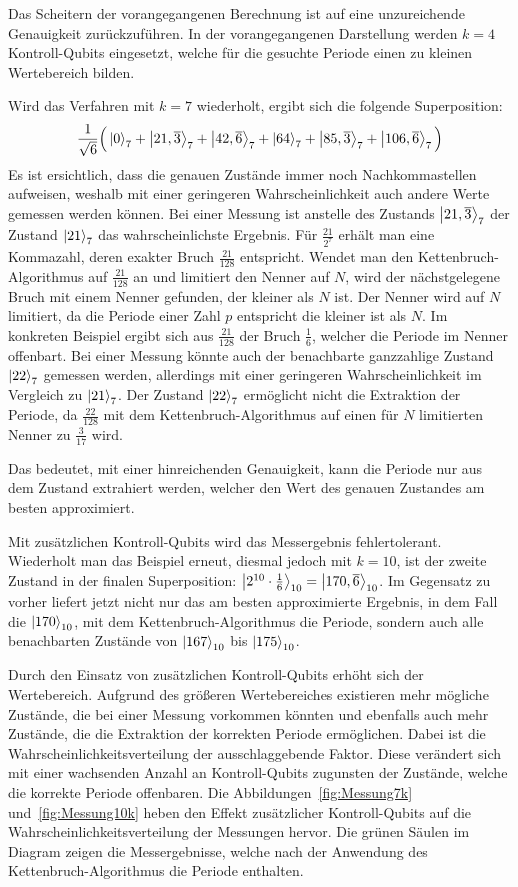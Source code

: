 Das Scheitern der vorangegangenen Berechnung ist auf eine unzureichende Genauigkeit zurückzuführen. 
In der vorangegangenen Darstellung werden \(k=4\) Kontroll-Qubits eingesetzt, 
welche für die gesuchte Periode einen zu kleinen Wertebereich bilden.

Wird das Verfahren mit \(k=7\) wiederholt, ergibt sich die folgende Superposition:
\[\frac{1}{\sqrt{6}}
\Big(\ket{0}_7 +\ket{21,\overline{3}}_7 + \ket{42,\overline{6}}_7+
\ket{64}_7+\ket{85,\overline{3}}_7 + \ket{106,\overline{6}}_7
\Big) \]
Es ist ersichtlich, dass die genauen Zustände immer noch Nachkommastellen aufweisen, 
weshalb mit einer geringeren Wahrscheinlichkeit auch andere Werte gemessen werden können.
Bei einer Messung ist anstelle des Zustands \(\ket{21,\overline{3}}_7\) der Zustand \(\ket{21}_7\) das wahrscheinlichste Ergebnis.
Für \(\frac{21}{2^{7}}\) erhält man eine Kommazahl, deren exakter Bruch \(\frac{21}{128}\) entspricht.
Wendet man den Kettenbruch-Algorithmus auf \(\frac{21}{128}\) an und limitiert den Nenner auf \(N\), 
wird der nächstgelegene Bruch mit einem Nenner gefunden, der kleiner als \(N\) ist.
Der Nenner wird auf \(N\) limitiert, da die Periode einer Zahl \(p\) entspricht die kleiner ist als \(N\).
Im konkreten Beispiel ergibt sich aus \(\frac{21}{128}\) der Bruch \(\frac{1}{6}\), 
welcher die Periode im Nenner offenbart.
Bei einer Messung könnte auch der benachbarte ganzzahlige Zustand \(\ket{22}_7\) gemessen werden, 
allerdings mit einer geringeren Wahrscheinlichkeit im Vergleich zu \(\ket{21}_7\).
Der Zustand \(\ket{22}_7\) ermöglicht nicht die Extraktion der Periode, 
da \(\frac{22}{128}\) mit dem Kettenbruch-Algorithmus auf einen für \(N\) limitierten Nenner
zu \(\frac{3}{17}\) wird.

Das bedeutet, 
mit einer hinreichenden Genauigkeit, kann die Periode nur aus dem Zustand extrahiert werden, 
welcher den Wert des genauen Zustandes am besten approximiert.

Mit zusätzlichen Kontroll-Qubits wird das Messergebnis fehlertolerant.
Wiederholt man das Beispiel erneut, diesmal jedoch mit \(k=10\), 
ist der zweite Zustand in der finalen Superposition: 
\(\ket{2^{10} \cdot \frac{1}{6}}_{10} =\ket{170,\overline{6}}_{10}\).
Im Gegensatz zu vorher liefert jetzt nicht nur das am besten approximierte Ergebnis, 
in dem Fall die \(\ket{170}_{10}\), mit dem Kettenbruch-Algorithmus die Periode, 
sondern auch alle benachbarten Zustände von \(\ket{167}_{10}\) bis \(\ket{175}_{10}\).

Durch den Einsatz von zusätzlichen Kontroll-Qubits erhöht sich der Wertebereich. 
Aufgrund des größeren Wertebereiches existieren mehr mögliche Zustände, 
die bei einer Messung vorkommen könnten und ebenfalls auch mehr Zustände, 
die die Extraktion der korrekten Periode ermöglichen. 
Dabei ist die Wahrscheinlichkeitsverteilung der ausschlaggebende Faktor. 
Diese verändert sich mit einer wachsenden Anzahl an Kontroll-Qubits zugunsten der Zustände, 
welche die korrekte Periode offenbaren.
Die Abbildungen~\ref{fig:Messung7k} und~\ref{fig:Messung10k} 
heben den Effekt zusätzlicher Kontroll-Qubits auf die Wahrscheinlichkeitsverteilung der Messungen hervor.
Die grünen Säulen im Diagram zeigen die Messergebnisse, 
welche nach der Anwendung des Kettenbruch-Algorithmus die Periode enthalten.

